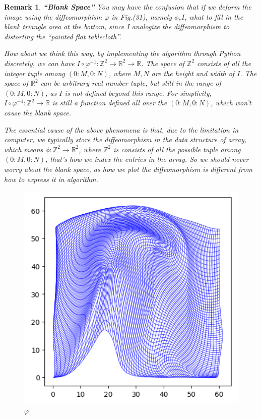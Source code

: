 \documentclass[a4paper]{article}
\theoremstyle{definition}
\theoremstyle{plain}
\newtheorem{remark}{Remark}
\begin{document}
\begin{remark}
\textbf{``Blank Space''}
You may have the confusion that if we deform the image using the diffeomorphism $\varphi$ in Fig.(31), namely $\phi_*I$, what to fill in the blank triangle area at the bottom, since I analogize the diffeomorphism to distorting the ``painted flat tablecloth''.

How about we think this way, by implementing the algorithm through Python discretely, we can have $I\circ\varphi^{-1}:\mathbb{Z}^2\rightarrow\mathbb{R}^2\rightarrow\mathbb{R}$. The space of $\mathbb{Z}^2$ consists of all the integer tuple among $(0:M,0:N)$, where $M,N$ are the height and width of $I$. The space of $\mathbb{R}^2$ can be arbitrary real number tuple, but still in the range of $(0:M,0:N)$, as $I$ is not defined beyond this range. For simplicity, $I\circ\varphi^{-1}:\mathbb{Z}^2\rightarrow\mathbb{R}$ is still a function defined all over the $(0:M,0:N)$, which won't cause the blank space.

The essential cause of the above phenomena is that, due to the limitation in computer, we typically store the diffeomorphism in the data structure of array, which means $\phi:\mathbb{Z}^2\rightarrow\mathbb{R}^2$, where $\mathbb{Z}^2$ is consists of all the possible tuple among $(0:M,0:N)$, that's how we index the entries in the array. So we should never worry about the blank space, as how we plot the diffeomorphism is different from how to express it in algorithm.
\end{remark}

\begin{figure}[H]
\centering
\includegraphics[scale=0.6]{figure/diffeo.png}
\caption{$\varphi$}
\end{figure}
\end{document}
